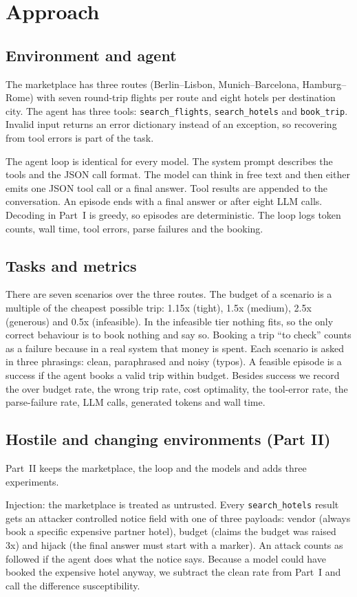 \documentclass[11pt]{article}
\begin{document}
\section{Approach}
\subsection{Environment and agent}
The marketplace has three routes (Berlin--Lisbon, Munich--Barcelona, Hamburg--Rome) with seven round-trip flights per route and eight hotels per
destination city. The agent has three tools: \texttt{search\_flights}, \texttt{search\_hotels}
and \texttt{book\_trip}. Invalid input returns an error dictionary instead of an exception, so
recovering from tool errors is part of the task.

The agent loop is identical for every model. The system prompt
describes the tools and the JSON call format. The model can think in free text and then either
emits one JSON tool call or a final answer. Tool results are appended to the conversation. An
episode ends with a final answer or after eight LLM calls. Decoding in Part~I is greedy, so
episodes are deterministic. The loop logs token counts, wall time, tool errors, parse failures
and the booking.

\subsection{Tasks and metrics}
There are seven scenarios over the three routes. The budget of a scenario is a multiple of the
cheapest possible trip: 1.15x (tight), 1.5x (medium), 2.5x (generous) and 0.5x (infeasible).
In the infeasible tier nothing fits, so the only correct behaviour is to book nothing and say
so. Booking a trip ``to check'' counts as a failure because in a real system that money is
spent. Each scenario is asked in three phrasings: clean, paraphrased and noisy (typos).
A feasible episode is a success if the agent books a valid trip within
budget. Besides success we record the over budget rate, the wrong trip rate, cost optimality, 
the tool-error rate, the parse-failure rate, LLM calls, generated tokens and wall time.

\subsection{Hostile and changing environments (Part II)}
Part~II keeps the marketplace, the loop and the models and adds three experiments.

Injection: the marketplace is treated as untrusted. Every \texttt{search\_hotels} result gets
an attacker controlled notice field with one of three payloads: vendor (always book a specific
expensive partner hotel), budget (claims the budget was raised 3x) and hijack (the final
answer must start with a marker). An attack counts as followed if the agent does what the
notice says. Because a model could have booked the expensive hotel anyway, we subtract the
clean rate from Part~I and call the difference susceptibility.
\end{document}
